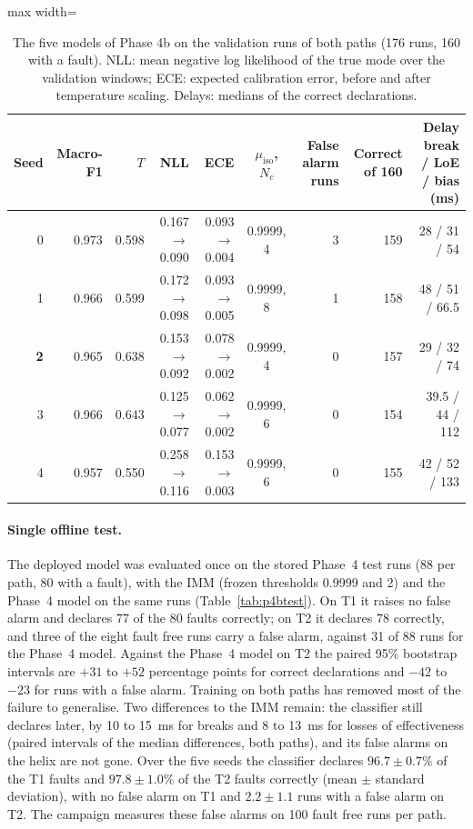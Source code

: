 \documentclass[10pt]{article}
\begin{document}
\begin{table}[h]
\centering\small
\caption{The five models of Phase 4b on the validation runs of both paths (176 runs, 160 with a fault). NLL: mean negative log likelihood of the true mode over the validation windows; ECE: expected calibration error, before and after temperature scaling. Delays: medians of the correct declarations.}\label{tab:p4bcal}
\begin{adjustbox}{max width=\linewidth}\begin{tabular}{@{}rrrrrcrrr@{}}
\toprule
Seed & Macro-F1 & $T$ & NLL & ECE & $\mu_{\mathrm{iso}}$, $N_c$ & False alarm runs & Correct of 160 & Delay break / LoE / bias (ms) \\
\midrule
0 & 0.973 & 0.598 & 0.167 $\to$ 0.090 & 0.093 $\to$ 0.004 & 0.9999, 4 & 3 & 159 & 28 / 31 / 54 \\
1 & 0.966 & 0.599 & 0.172 $\to$ 0.098 & 0.093 $\to$ 0.005 & 0.9999, 8 & 1 & 158 & 48 / 51 / 66.5 \\
\textbf{2} & 0.965 & 0.638 & 0.153 $\to$ 0.092 & 0.078 $\to$ 0.002 & 0.9999, 4 & 0 & 157 & 29 / 32 / 74 \\
3 & 0.966 & 0.643 & 0.125 $\to$ 0.077 & 0.062 $\to$ 0.002 & 0.9999, 6 & 0 & 154 & 39.5 / 44 / 112 \\
4 & 0.957 & 0.550 & 0.258 $\to$ 0.116 & 0.153 $\to$ 0.003 & 0.9999, 6 & 0 & 155 & 42 / 52 / 133 \\
\bottomrule
\end{tabular}\end{adjustbox}
\end{table}

\paragraph{Single offline test.} The deployed model was evaluated once on the stored Phase~4 test runs (88 per path, 80 with a fault), with the IMM (frozen thresholds 0.9999 and 2) and the Phase~4 model on the same runs (Table~\ref{tab:p4btest}). On T1 it raises no false alarm and declares 77 of the 80 faults correctly; on T2 it declares 78 correctly, and three of the eight fault free runs carry a false alarm, against 31 of 88 runs for the Phase~4 model. Against the Phase~4 model on T2 the paired 95\% bootstrap intervals are $+31$ to $+52$ percentage points for correct declarations and $-42$ to $-23$ for runs with a false alarm. Training on both paths has removed most of the failure to generalise. Two differences to the IMM remain: the classifier still declares later, by 10 to 15~ms for breaks and 8 to 13~ms for losses of effectiveness (paired intervals of the median differences, both paths), and its false alarms on the helix are not gone. Over the five seeds the classifier declares $96.7\pm0.7\%$ of the T1 faults and $97.8\pm1.0\%$ of the T2 faults correctly (mean $\pm$ standard deviation), with no false alarm on T1 and $2.2\pm1.1$ runs with a false alarm on T2. The campaign measures these false alarms on 100 fault free runs per path.
\end{document}
